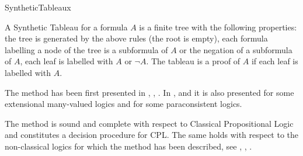 \begin{entry}{SyntheticTableaux}
\begin{calculus}
\begin{center}
\end{center}

\end{calculus}

\begin{clarifications}
A Synthetic Tableau for a formula $A$ is a finite tree with the following properties: the tree is generated by the above rules (the root is empty), each formula labelling a node of the tree is a subformula of $A$ or the negation of a subformula of $A$, each leaf is labelled with $A$ or $\lnot A$. The tableau is a proof of $A$ if each leaf is labelled with $A$.\end{clarifications}

\begin{history}
The method has been first presented in \cite{Urbanski2001a}, \cite{Urbanski2001b}, \cite{Urbanski2002a}. In \cite{Urbanski2002a}, \cite{Urbanski2002b} and \cite{Urbanski2004} it is also presented for some extensional many-valued logics and for some paraconsistent logics.
\end{history}

\begin{technicalities}
The method is sound and complete with respect to Classical Propositional Logic and constitutes a decision procedure for CPL. The same holds with respect to the non-classical logics for which the method has been described, see \cite{Urbanski2002a}, \cite{Urbanski2002b}, \cite{Urbanski2004}.
\end{technicalities}



%
%
%
%
%
%
% 
%




\end{entry}
